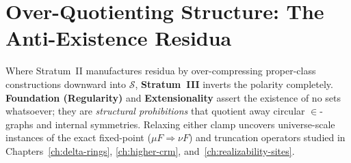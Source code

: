 \section{Over-Quotienting Structure: The Anti-Existence Residua}\label{sec:anti-existence-residua}

Where Stratum~II manufactures residua by over-compressing proper-class constructions downward into $\mathcal{S}$, \textbf{Stratum~III} inverts the polarity completely. \textbf{Foundation (Regularity)} and \textbf{Extensionality} assert the existence of no sets whatsoever; they are \emph{structural prohibitions} that quotient away circular $\in$-graphs and internal symmetries. Relaxing either clamp uncovers universe-scale instances of the exact fixed-point ($\mu F \Rightarrow \nu F$) and truncation operators studied in Chapters~\ref{ch:delta-rings}, \ref{ch:higher-crm}, and~\ref{ch:realizability-sites}.

